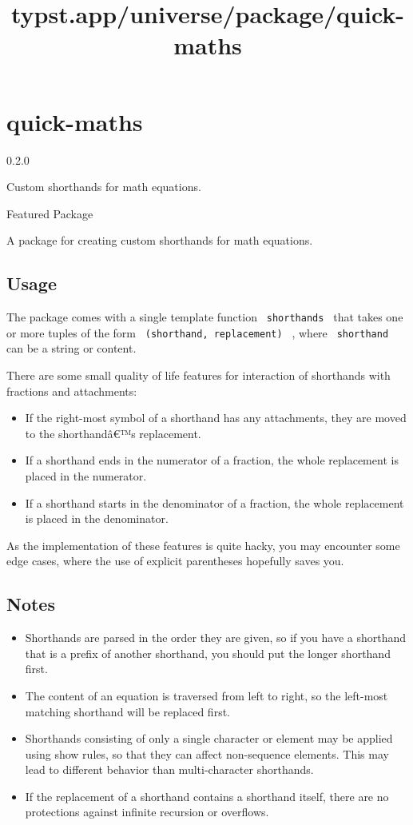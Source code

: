 \title{typst.app/universe/package/quick-maths}

\label{banner}
\section{quick-maths}\label{quick-maths}

{ 0.2.0 }

Custom shorthands for math equations.

{ } Featured Package

\label{readme}
A package for creating custom shorthands for math equations.

\subsection{Usage}\label{usage}

The package comes with a single template function
\texttt{\ shorthands\ } that takes one or more tuples of the form
\texttt{\ (shorthand,\ replacement)\ } , where \texttt{\ shorthand\ }
can be a string or content.

There are some small quality of life features for interaction of
shorthands with fractions and attachments:

\begin{itemize}
\tightlist
\item
  If the right-most symbol of a shorthand has any attachments, they are
  moved to the shorthandâ€™s replacement.
\item
  If a shorthand ends in the numerator of a fraction, the whole
  replacement is placed in the numerator.
\item
  If a shorthand starts in the denominator of a fraction, the whole
  replacement is placed in the denominator.
\end{itemize}

As the implementation of these features is quite hacky, you may
encounter some edge cases, where the use of explicit parentheses
hopefully saves you.

\subsection{Notes}\label{notes}

\begin{itemize}
\item
  Shorthands are parsed in the order they are given, so if you have a
  shorthand that is a prefix of another shorthand, you should put the
  longer shorthand first.
\item
  The content of an equation is traversed from left to right, so the
  left-most matching shorthand will be replaced first.
\item
  Shorthands consisting of only a single character or element may be
  applied using show rules, so that they can affect non-sequence
  elements. This may lead to different behavior than multi-character
  shorthands.
\item
  If the replacement of a shorthand contains a shorthand itself, there
  are no protections against infinite recursion or overflows.
\end{itemize}

